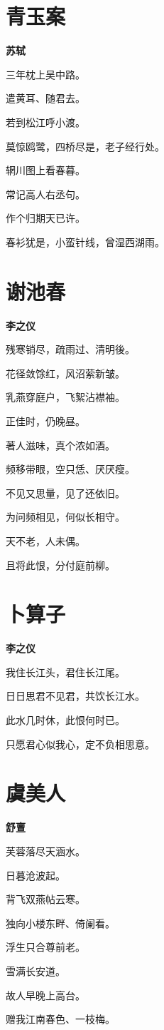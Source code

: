 \documentclass[12pt,a4paper]{ctexbook}
\begin{document}
\section{青玉案}
\textbf{苏轼}\par\vspace{0.5em}
三年枕上吴中路。\par
遣黄耳、随君去。\par
若到松江呼小渡。\par
莫惊鸥鹭，四桥尽是，老子经行处。\par
辋川图上看春暮。\par
常记高人右丞句。\par
作个归期天已许。\par
春衫犹是，小蛮针线，曾湿西湖雨。\par

\section{谢池春}
\textbf{李之仪}\par\vspace{0.5em}
残寒销尽，疏雨过、清明後。\par
花径敛馀红，风沼萦新皱。\par
乳燕穿庭户，飞絮沾襟袖。\par
正佳时，仍晚昼。\par
著人滋味，真个浓如酒。\par
频移带眼，空只恁、厌厌瘦。\par
不见又思量，见了还依旧。\par
为问频相见，何似长相守。\par
天不老，人未偶。\par
且将此恨，分付庭前柳。\par

\section{卜算子}
\textbf{李之仪}\par\vspace{0.5em}
我住长江头，君住长江尾。\par
日日思君不见君，共饮长江水。\par
此水几时休，此恨何时已。\par
只愿君心似我心，定不负相思意。\par

\section{虞美人}
\textbf{舒亶}\par\vspace{0.5em}
芙蓉落尽天涵水。\par
日暮沧波起。\par
背飞双燕帖云寒。\par
独向小楼东畔、倚阑看。\par
浮生只合尊前老。\par
雪满长安道。\par
故人早晚上高台。\par
赠我江南春色、一枝梅。\par
\end{document}
